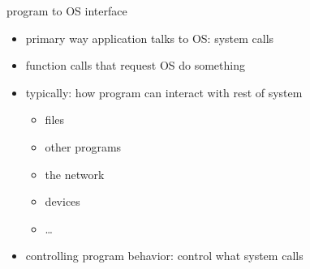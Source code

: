 \begin{frame}{program to OS interface}
    \begin{itemize}
    \item primary way application talks to OS: system calls
    \vspace{.5cm}
    \item function calls that request OS do something
    \item typically: how program can interact with rest of system
        \begin{itemize}
        \item files
        \item other programs
        \item the network
        \item devices
        \item\ldots
        \end{itemize}
    \vspace{.5cm}
    \item controlling program behavior: control what system calls
    \end{itemize}
\end{frame}

